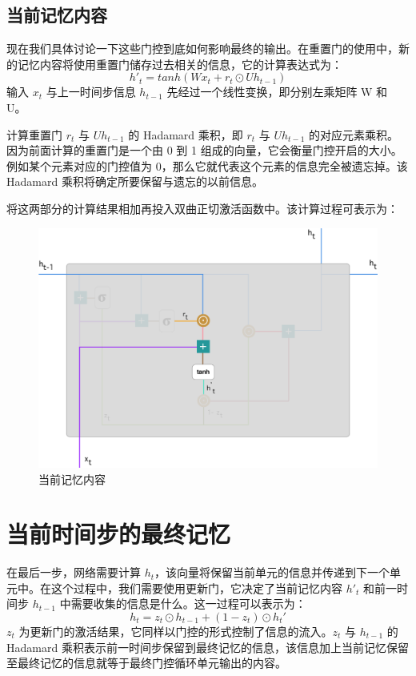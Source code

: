 \documentclass{article}
\begin{document}
\subsection{当前记忆内容}
现在我们具体讨论一下这些门控到底如何影响最终的输出。在重置门的使用中，新的记忆内容将使用重置门储存过去相关的信息，它的计算表达式为：
\[h'_t = tanh(Wx_t+r_t\odot Uh_{t-1})\]
输入 $x_t$ 与上一时间步信息 $h_{t-1}$ 先经过一个线性变换，即分别左乘矩阵 W 和 U。

计算重置门 $r_t$ 与 $Uh_{t-1}$ 的 Hadamard 乘积，即 $r_t$ 与 $Uh_{t-1}$ 的对应元素乘积。因为前面计算的重置门是一个由 0 到 1 组成的向量，它会衡量门控开启的大小。例如某个元素对应的门控值为 0，那么它就代表这个元素的信息完全被遗忘掉。该 Hadamard 乘积将确定所要保留与遗忘的以前信息。

将这两部分的计算结果相加再投入双曲正切激活函数中。该计算过程可表示为：
\begin{figure}[H]
	\centering
	\includegraphics[scale=0.2]{GRU6.png}
	\caption{当前记忆内容}
\end{figure}
\section{当前时间步的最终记忆}
在最后一步，网络需要计算 $h_t$，该向量将保留当前单元的信息并传递到下一个单元中。在这个过程中，我们需要使用更新门，它决定了当前记忆内容 $h'_t$ 和前一时间步 $h_{t-1}$ 中需要收集的信息是什么。这一过程可以表示为：
\[h_t = z_t\odot h_{t-1}+(1-z_t)\odot h_t'\]
$z_t$ 为更新门的激活结果，它同样以门控的形式控制了信息的流入。$z_t$ 与 $h_{t-1}$ 的 Hadamard 乘积表示前一时间步保留到最终记忆的信息，该信息加上当前记忆保留至最终记忆的信息就等于最终门控循环单元输出的内容。
\end{document}
